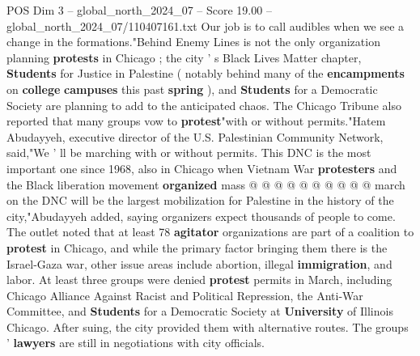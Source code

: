 \begin{textsample}{POS Dim 3 – global\_north\_2024\_07 – Score 19.00 – global\_north\_2024\_07/110407161.txt}
Our job is to call audibles when we see a change in the formations."Behind Enemy Lines is not the only organization planning \textbf{protests} in Chicago ; the city ' s Black Lives Matter chapter, \textbf{Students} for Justice in Palestine ( notably behind many of the \textbf{encampments} on \textbf{college} \textbf{campuses} this past \textbf{spring} ), and \textbf{Students} for a Democratic Society are planning to add to the anticipated chaos.
The Chicago Tribune also reported that many groups vow to \textbf{protest}"with or without permits."Hatem Abudayyeh, executive director of the U.S.
Palestinian Community Network, said,"We ' ll be marching with or without permits.
This DNC is the most important one since 1968, also in Chicago when Vietnam War \textbf{protesters} and the Black liberation movement \textbf{organized} mass @ @ @ @ @ @ @ @ @ @ march on the DNC will be the largest mobilization for Palestine in the history of the city,"Abudayyeh added, saying organizers expect thousands of people to come.
The outlet noted that at least 78 \textbf{agitator} organizations are part of a coalition to \textbf{protest} in Chicago, and while the primary factor bringing them there is the Israel-Gaza war, other issue areas include abortion, illegal \textbf{immigration}, and labor.
At least three groups were denied \textbf{protest} permits in March, including Chicago Alliance Against Racist and Political Repression, the Anti-War Committee, and \textbf{Students} for a Democratic Society at \textbf{University} of Illinois Chicago.
After suing, the city provided them with alternative routes.
The groups ' \textbf{lawyers} are still in negotiations with city officials.

\end{textsample}
